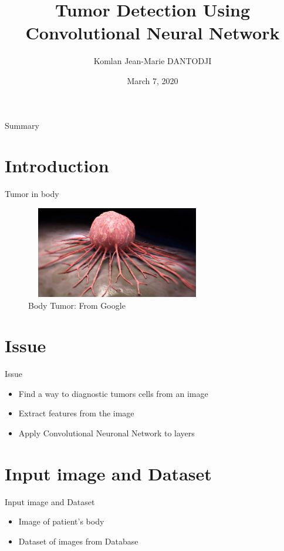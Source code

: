 \documentclass{beamer}
\title[Body Tumor Detection Using Convolutional Neural Network] 
{Tumor Detection Using Convolutional Neural Network}
\author[Komlan Dantodji] 
{Komlan Jean-Marie DANTODJI}
\institute[]
{
  Etudiant en M1 Big Data
  \and
  Université Paris 8}
\date{March 7, 2020}
\begin{document}
\begin{frame}
  \titlepage
\end{frame}

\begin{frame}{Summary}
  \tableofcontents
\end{frame}

\section{Introduction}
\begin{frame}{Tumor in body}
\begin{figure}[H]
    \includegraphics[width=8cm,height=4cm]{images/tumor.jpg}
    \caption{ Body Tumor: From Google}
    \label{fig:L1}
\end{figure}
\end{frame}

\section{Issue}
\begin{frame}{Issue}
\begin{itemize}
		\item Find a way to diagnostic tumors cells from an image 
		\item Extract features from the image
		\item Apply Convolutional Neuronal Network to layers 
\end{itemize}
\end{frame} 


\section{Input image and Dataset}
\begin{frame}{Input image and Dataset}
\begin{itemize}
		\item Image of patient's body
		\item Dataset of images from Database
\end{itemize}
\end{frame} 
\end{document}
